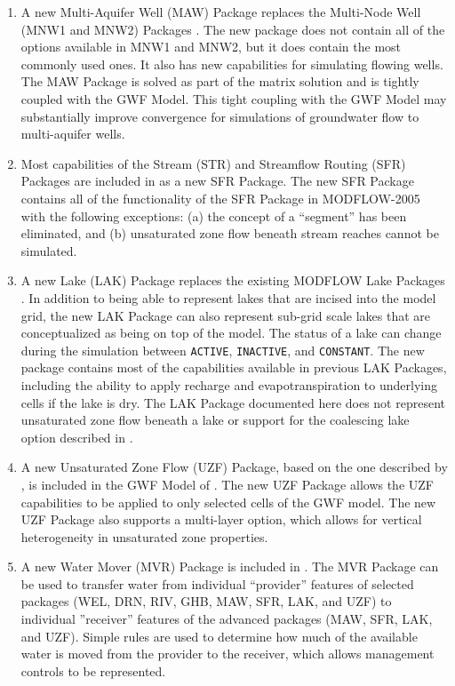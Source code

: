 \begin{enumerate}
\item A new Multi-Aquifer Well (MAW) Package replaces the Multi-Node Well (MNW1 and MNW2) Packages \citep{halford2002, konikow2009}. The new package does not contain all of the options available in MNW1 and MNW2, but it does contain the most commonly used ones.  It also has new capabilities for simulating flowing wells. The MAW Package is solved as part of the matrix solution and is tightly coupled with the GWF Model. This tight coupling with the GWF Model may substantially improve convergence for simulations of groundwater flow to multi-aquifer wells.

\item Most capabilities of the Stream (STR) and Streamflow Routing (SFR) Packages \citep{prudic1989str, modflowsfr1pack, modflowsfr2pack} are included in \mf as a new SFR Package.  The new SFR Package contains all of the functionality of the SFR Package in MODFLOW-2005 with the following exceptions: (a) the concept of a ``segment'' has been eliminated, and (b) unsaturated zone flow beneath stream reaches cannot be simulated.

\item A new Lake (LAK) Package replaces the existing MODFLOW Lake Packages \citep{modflowlak3pack}. In addition to being able to represent lakes that are incised into the model grid, the new LAK Package can also represent sub-grid scale lakes that are conceptualized as being on top of the model.  The status of a lake can change during the simulation between \texttt{ACTIVE}, \texttt{INACTIVE}, and \texttt{CONSTANT}.  The new package contains most of the capabilities available in previous LAK Packages, including the ability to apply recharge and evapotranspiration to underlying cells if the lake is dry.  The LAK Package documented here does not represent unsaturated zone flow beneath a lake or support for the coalescing lake option described in \cite{modflowlak3pack}. 

\item A new Unsaturated Zone Flow (UZF) Package, based on the one described by \cite{UZF}, is included in the GWF Model of \mf. The new UZF Package allows the UZF capabilities to be applied to only selected cells of the GWF model. The new UZF Package also supports a multi-layer option, which allows for vertical heterogeneity in unsaturated zone properties.

\item A new Water Mover (MVR) Package is included in \mf.  The MVR Package can be used to transfer water from individual ``provider'' features of selected packages (WEL, DRN, RIV, GHB, MAW, SFR, LAK, and UZF) to individual ''receiver'' features of the advanced packages (MAW, SFR, LAK, and UZF).  Simple rules are used to determine how much of the available water is moved from the provider to the receiver, which allows management controls to be represented. 


\end{enumerate}
